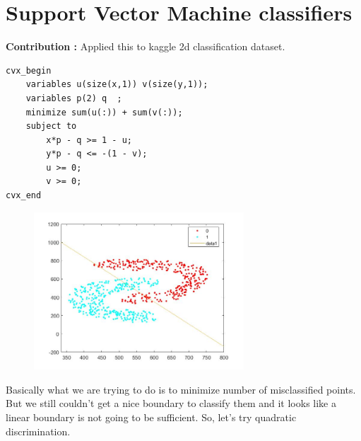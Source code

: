 \documentclass{article}
\begin{document}
\newpage
\section{Support Vector Machine classifiers}
\textbf{Contribution : } Applied this to kaggle 2d classification dataset.
\begin{verbatim}
cvx_begin
    variables u(size(x,1)) v(size(y,1));
    variables p(2) q  ;
    minimize sum(u(:)) + sum(v(:));
    subject to
        x*p - q >= 1 - u;
        y*p - q <= -(1 - v);
        u >= 0;
        v >= 0;
cvx_end
\end{verbatim}
\begin{figure}[h!]
    \includegraphics[width=0.7\textwidth, center ]{data2.jpg}
\end{figure}
Basically what we are trying to do is to minimize number of misclassified points. But we still couldn't get a nice boundary to classify them and it looks like a linear boundary is not going to be sufficient. So, let's try quadratic discrimination.
\newpage
\end{document}
